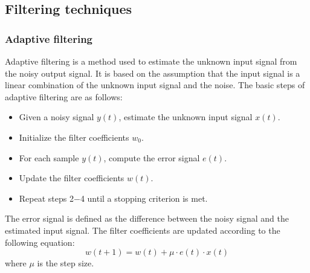 \documentclass[a4paper, noexaminfo]{sapthesis}
\begin{document}
\subsection{Filtering techniques}\label{sec:filtering}
\subsubsection{Adaptive filtering}
Adaptive filtering\cite{adaptive} is a method used to estimate the
unknown input signal from the noisy output signal. It is based on the
assumption that the input signal is a linear combination of the unknown
input signal and the noise. \newline
The basic steps of adaptive filtering are as follows:
\begin{itemize}
    \item Given a noisy signal $y(t)$, estimate the unknown input signal
    $x(t)$.
    \item Initialize the filter coefficients $w_0$.
    \item For each sample $y(t)$, compute the error signal $e(t)$.
    \item Update the filter coefficients $w(t)$.
    \item Repeat steps 2$-$4 until a stopping criterion is met.
    
\end{itemize}
The error signal is defined as the difference between the noisy signal
and the estimated input signal. The filter coefficients are updated
according to the following equation:
\begin{equation}
\label{eq:adaptive}
w(t+1) = w(t) + \mu \cdot e(t) \cdot x(t)
\end{equation}
where $\mu$ is the step size. \newline
\end{document}
